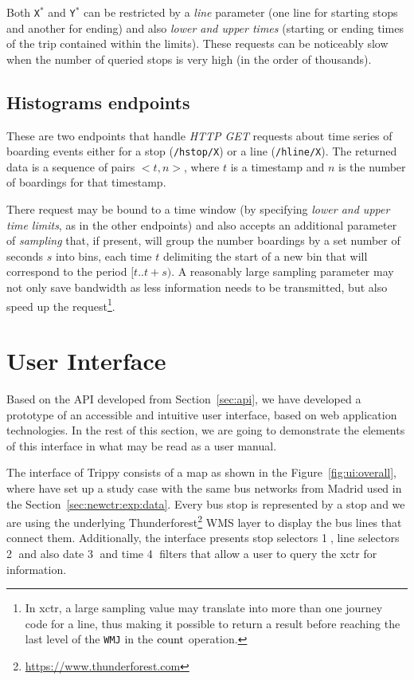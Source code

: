     Both \texttt{X$^*$} and \texttt{Y$^*$} can be restricted by a \textit{line} parameter (one line for starting stops and another for ending) and also \textit{lower and upper times} (starting or ending times of the trip contained within the limits). These requests can be noticeably slow when the number of queried stops is very high (in the order of thousands).
    
    \subsection{Histograms endpoints}
    These are two endpoints that handle {\em HTTP GET} requests about time series of boarding events either for a stop (\texttt{/hstop/X}) or a line (\texttt{/hline/X}). The returned data is a sequence of pairs $<t,n>$, where $t$ is a timestamp and $n$ is the number of boardings for that timestamp.
    
    There request may be bound to a time window (by specifying \textit{lower and upper time limits}, as in the other endpoints) and also accepts an additional parameter of \textit{sampling} that, if present, will group the number boardings by a set number of seconds $s$ into bins, each time $t$ delimiting the start of a new bin that will correspond to the period $[t..t+s)$. A reasonably large sampling parameter may not only save bandwidth as less information needs to be transmitted, but also speed up the request\footnote{In \gls{xctr}, a large sampling value may translate into more than one journey code for a line, thus making it possible to return a result before reaching the last level of the \texttt{WMJ} in the $\operatorname{count}$ operation.}.
	
	\section{User Interface}
	\label{sec:ui}
	Based on the API developed from Section~\ref{sec:api}, we have developed a prototype of an accessible and intuitive user interface, based on web application technologies. In the rest of this section, we are going to demonstrate the elements of this interface in what may be read as a user manual.
	
    The interface of Trippy consists of a map as shown in the Figure~\ref{fig:ui:overall}, where have set up a study case with the same bus networks from Madrid used in the Section~\ref{sec:newctr:exp:data}. Every bus stop is represented by a stop and we are using the underlying Thunderforest\footnote{\url{https://www.thunderforest.com}} WMS layer to display the bus lines that connect them. Additionally, the interface presents stop selectors \textcircled{1}, line selectors \textcircled{2} and also date \textcircled{3} and time \textcircled{4} filters that allow a user to query the \gls{xctr} for information.
    
